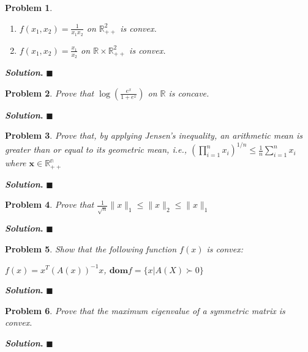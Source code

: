 \documentclass[12pt]{article}
\newtheorem{problem}{Problem}
\newenvironment{solution}[1][\textit{Solution}]{\textbf{#1. }}{$\blacksquare$}
\begin{document}
  \begin{problem}
    \begin{enumerate}
      \item $f(x_1, x_2) = \frac{1}{x_{1}x_{2}}$ on $\mathbb{R}^{2}_{++}$ is convex. 
      \item $f(x_1, x_2) = \frac{x_1}{x_{2}}$  on $\mathbb{R} \times \mathbb{R}^{2}_{++}$ is convex. 
    \end{enumerate}
  \end{problem}
  \begin{solution}
  \end{solution}

  \begin{problem}
    Prove that $\log(\frac{e^x}{1 + e^x})$ on $\mathbb{R}$ is concave.
  \end{problem}
  \begin{solution}
  \end{solution}

  \begin{problem}
    Prove that, by applying Jensen’s inequality, an arithmetic mean is greater than or equal to its geometric mean, i.e., $(\prod_{i=1}^{n} x_{i})^{1/n} \leq \frac{1}{n}\sum_{i=1}^{n} x_{i}$ where $\textbf{x} \in \mathbb{R^{n}_{++}}$
  \end{problem}
  \begin{solution}
  \end{solution}
  
  \begin{problem}
    Prove that $\frac{1}{\sqrt{n}}\lVert x \rVert_{1} \leq \lVert x \rVert_{2} \leq \lVert x \rVert_{1}$
  \end{problem}
  \begin{solution}
  \end{solution}

  \begin{problem}
    Show that the following function $f(x)$ is convex:\\
    \begin{center}
      $f(x) = x^{T}(A(x))^{-1}x$, $\textbf{dom}{f} = \{x | A(X) \succ 0\}$
    \end{center}
  \end{problem}
  \begin{solution}
  \end{solution}

  \begin{problem}
    Prove that the maximum eigenvalue of a symmetric matrix is convex.
  \end{problem}
  \begin{solution}
  \end{solution}
\end{document}
